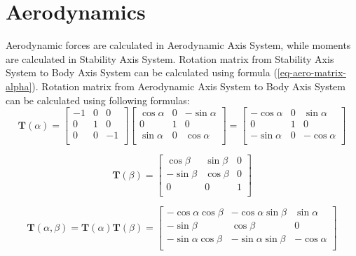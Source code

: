 \chapter{Aerodynamics}

Aerodynamic forces are calculated in Aerodynamic Axis System, while moments are calculated in Stability Axis System. Rotation matrix from Stability Axis System to Body Axis System can be calculated using formula (\ref{eq-aero-matrix-alpha}). Rotation matrix from Aerodynamic Axis System to Body Axis System can be calculated using following formulas:
\begin{equation}
  \label{eq-aero-matrix-alpha}
  \boldsymbol T \left( \alpha \right)
  =
  \left[
    \begin{matrix}
      -1 & 0 &  0 \\
       0 & 1 &  0 \\
       0 & 0 & -1 \\
    \end{matrix}
  \right]
  \left[
    \begin{matrix}
      \cos \alpha & 0 & -\sin \alpha \\
                0 & 1 &            0 \\
      \sin \alpha & 0 &  \cos \alpha \\
    \end{matrix}
  \right]
  =
  \left[
    \begin{matrix}
      -\cos \alpha & 0 &  \sin \alpha \\
                 0 & 1 &            0 \\
      -\sin \alpha & 0 & -\cos \alpha \\
    \end{matrix}
  \right]
\end{equation}

\begin{equation}
  \label{eq-aero-matrix-beta}
  \boldsymbol T \left( \beta \right)
  =
  \left[
    \begin{matrix}
       \cos \beta & \sin \beta & 0 \\
      -\sin \beta & \cos \beta & 0 \\
                0 &          0 & 1 \\
    \end{matrix}
  \right]
\end{equation}

\begin{equation}
  \boldsymbol T \left( \alpha, \beta \right)
  =
  \boldsymbol T \left( \alpha \right) \boldsymbol T \left( \beta \right)
  =
  \left[
    \begin{matrix}
      -\cos \alpha \cos \beta & -\cos \alpha \sin \beta &  \sin \alpha \\
                  -\sin \beta &              \cos \beta &            0 \\
      -\sin \alpha \cos \beta & -\sin \alpha \sin \beta & -\cos \alpha \\
    \end{matrix}
  \right]
\end{equation}

